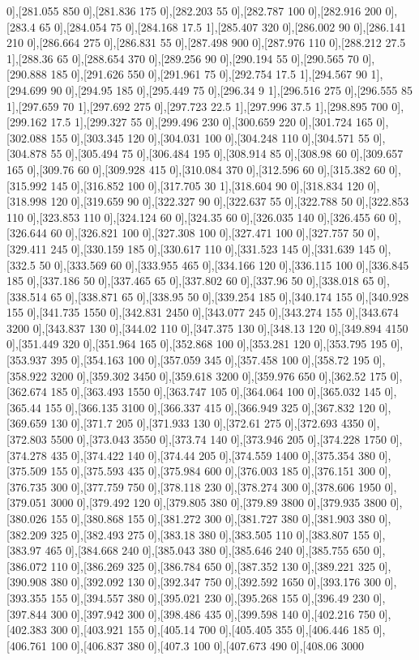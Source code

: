 {0],[281.055 850 0],[281.836 175 0],[282.203 55 0],[282.787 100 0],[282.916 200 0],[283.4 65 0],[284.054 75 0],[284.168 17.5 1],[285.407 320 0],[286.002 90 0],[286.141 210 0],[286.664 275 0],[286.831 55 0],[287.498 900 0],[287.976 110 0],[288.212 27.5 1],[288.36 65 0],[288.654 370 0],[289.256 90 0],[290.194 55 0],[290.565 70 0],[290.888 185 0],[291.626 550 0],[291.961 75 0],[292.754 17.5 1],[294.567 90 1],[294.699 90 0],[294.95 185 0],[295.449 75 0],[296.34 9 1],[296.516 275 0],[296.555 85 1],[297.659 70 1],[297.692 275 0],[297.723 22.5 1],[297.996 37.5 1],[298.895 700 0],[299.162 17.5 1],[299.327 55 0],[299.496 230 0],[300.659 220 0],[301.724 165 0],[302.088 155 0],[303.345 120 0],[304.031 100 0],[304.248 110 0],[304.571 55 0],[304.878 55 0],[305.494 75 0],[306.484 195 0],[308.914 85 0],[308.98 60 0],[309.657 165 0],[309.76 60 0],[309.928 415 0],[310.084 370 0],[312.596 60 0],[315.382 60 0],[315.992 145 0],[316.852 100 0],[317.705 30 1],[318.604 90 0],[318.834 120 0],[318.998 120 0],[319.659 90 0],[322.327 90 0],[322.637 55 0],[322.788 50 0],[322.853 110 0],[323.853 110 0],[324.124 60 0],[324.35 60 0],[326.035 140 0],[326.455 60 0],[326.644 60 0],[326.821 100 0],[327.308 100 0],[327.471 100 0],[327.757 50 0],[329.411 245 0],[330.159 185 0],[330.617 110 0],[331.523 145 0],[331.639 145 0],[332.5 50 0],[333.569 60 0],[333.955 465 0],[334.166 120 0],[336.115 100 0],[336.845 185 0],[337.186 50 0],[337.465 65 0],[337.802 60 0],[337.96 50 0],[338.018 65 0],[338.514 65 0],[338.871 65 0],[338.95 50 0],[339.254 185 0],[340.174 155 0],[340.928 155 0],[341.735 1550 0],[342.831 2450 0],[343.077 245 0],[343.274 155 0],[343.674 3200 0],[343.837 130 0],[344.02 110 0],[347.375 130 0],[348.13 120 0],[349.894 4150 0],[351.449 320 0],[351.964 165 0],[352.868 100 0],[353.281 120 0],[353.795 195 0],[353.937 395 0],[354.163 100 0],[357.059 345 0],[357.458 100 0],[358.72 195 0],[358.922 3200 0],[359.302 3450 0],[359.618 3200 0],[359.976 650 0],[362.52 175 0],[362.674 185 0],[363.493 1550 0],[363.747 105 0],[364.064 100 0],[365.032 145 0],[365.44 155 0],[366.135 3100 0],[366.337 415 0],[366.949 325 0],[367.832 120 0],[369.659 130 0],[371.7 205 0],[371.933 130 0],[372.61 275 0],[372.693 4350 0],[372.803 5500 0],[373.043 3550 0],[373.74 140 0],[373.946 205 0],[374.228 1750 0],[374.278 435 0],[374.422 140 0],[374.44 205 0],[374.559 1400 0],[375.354 380 0],[375.509 155 0],[375.593 435 0],[375.984 600 0],[376.003 185 0],[376.151 300 0],[376.735 300 0],[377.759 750 0],[378.118 230 0],[378.274 300 0],[378.606 1950 0],[379.051 3000 0],[379.492 120 0],[379.805 380 0],[379.89 3800 0],[379.935 3800 0],[380.026 155 0],[380.868 155 0],[381.272 300 0],[381.727 380 0],[381.903 380 0],[382.209 325 0],[382.493 275 0],[383.18 380 0],[383.505 110 0],[383.807 155 0],[383.97 465 0],[384.668 240 0],[385.043 380 0],[385.646 240 0],[385.755 650 0],[386.072 110 0],[386.269 325 0],[386.784 650 0],[387.352 130 0],[389.221 325 0],[390.908 380 0],[392.092 130 0],[392.347 750 0],[392.592 1650 0],[393.176 300 0],[393.355 155 0],[394.557 380 0],[395.021 230 0],[395.268 155 0],[396.49 230 0],[397.844 300 0],[397.942 300 0],[398.486 435 0],[399.598 140 0],[402.216 750 0],[402.383 300 0],[403.921 155 0],[405.14 700 0],[405.405 355 0],[406.446 185 0],[406.761 100 0],[406.837 380 0],[407.3 100 0],[407.673 490 0],[408.06 3000 }
